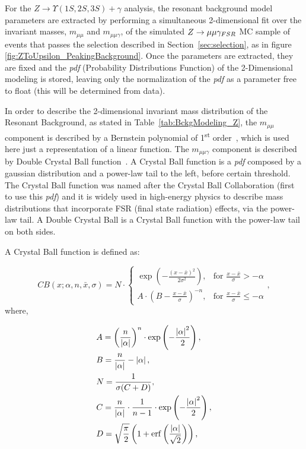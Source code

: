 For the $Z \rightarrow \Upsilon(1S,2S,3S) +\gamma$ analysis, the resonant background model parameters are extracted by performing a simultaneous 2-dimensional fit over the invariant masses, $m_{\mu\mu}$ and $m_{\mu\mu\gamma}$, of the simulated $Z \rightarrow \mu\mu\gamma_{\small{FSR}}$ MC sample of events that passes the selection described in Section~\ref{sec:selection}, as in figure \ref{fig:ZToUpsilon_PeakingBackground}. Once the parameters are extracted, they are fixed and the \textit{pdf} (Probability Distributions Function) of the 2-Dimensional modeling is stored, leaving only the normalization of the \textit{pdf} as a parameter free to float (this will be determined from data). 

In order to describe the 2-dimensional invariant mass distribution of the Resonant Background, as stated in Table~\ref{tab:BckgModeling_Z}, the $m_{\mu\mu}$ component is described by a Bernstein polynomial of 1\textsuperscript{st} order~\cite{Bernstein_pol}, which is used here just a representation of a linear function. The $m_{\mu\mu\gamma}$ component is described by Double Crystal Ball function~\cite{cb_function}. A Crystal Ball function is a \textit{pdf} composed by a gaussian distribution and a power-law tail to the left, before certain threshold. The Crystal Ball function was named after the Crystal Ball Collaboration (first to use this \textit{pdf}) and it is widely used in high-energy physics to describe mass distributions that incorporate FSR (final state radiation) effects, via the power-law tail. A Double Crystal Ball is a Crystal Ball function with the power-law tail on both sides.

A Crystal Ball function is defined as:


\begin{equation}
\label{eqn:cb_function}
CB(x;\alpha,n,\bar x,\sigma) = N \cdot \begin{cases} \exp(- \frac{(x - \bar x)^2}{2 \sigma^2}), & \mbox{for }\frac{x - \bar x}{\sigma} > -\alpha \\
 A \cdot (B - \frac{x - \bar x}{\sigma})^{-n}, & \mbox{for }\frac{x - \bar x}{\sigma} \leqslant -\alpha \end{cases},
\end{equation}
where,

\begin{equation}
    \begin{split}
        &A = \left(\frac{n}{\left| \alpha \right|}\right)^n \cdot \exp\left(- \frac {\left| \alpha \right|^2}{2}\right), \notag\\
        &B = \frac{n}{\left| \alpha \right|}  - \left| \alpha \right|, \notag\\
        &N = \frac{1}{\sigma (C + D)}, \notag\\
        &C = \frac{n}{\left| \alpha \right|} \cdot \frac{1}{n-1} \cdot \exp\left(- \frac {\left| \alpha \right|^2}{2}\right), \notag\\
        &D = \sqrt{\frac{\pi}{2}} \left(1 + \operatorname{erf}\left(\frac{\left| \alpha \right|}{\sqrt 2}\right)\right),
    \end{split}
\end{equation}

